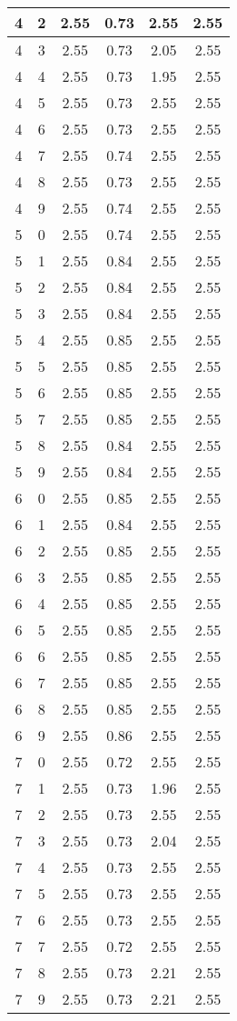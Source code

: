 \begin{longtable}{|c|c||c||c|c||c|}
	4 & 2 & 2.55 & 0.73 & 2.55 & 2.55 \\ \hline
	4 & 3 & 2.55 & 0.73 & 2.05 & 2.55 \\ \hline
	4 & 4 & 2.55 & 0.73 & 1.95 & 2.55 \\ \hline
	4 & 5 & 2.55 & 0.73 & 2.55 & 2.55 \\ \hline
	4 & 6 & 2.55 & 0.73 & 2.55 & 2.55 \\ \hline
	4 & 7 & 2.55 & 0.74 & 2.55 & 2.55 \\ \hline
	4 & 8 & 2.55 & 0.73 & 2.55 & 2.55 \\ \hline
	4 & 9 & 2.55 & 0.74 & 2.55 & 2.55 \\ \hline
	5 & 0 & 2.55 & 0.74 & 2.55 & 2.55 \\ \hline
	5 & 1 & 2.55 & 0.84 & 2.55 & 2.55 \\ \hline
	5 & 2 & 2.55 & 0.84 & 2.55 & 2.55 \\ \hline
	5 & 3 & 2.55 & 0.84 & 2.55 & 2.55 \\ \hline
	5 & 4 & 2.55 & 0.85 & 2.55 & 2.55 \\ \hline
	5 & 5 & 2.55 & 0.85 & 2.55 & 2.55 \\ \hline
	5 & 6 & 2.55 & 0.85 & 2.55 & 2.55 \\ \hline
	5 & 7 & 2.55 & 0.85 & 2.55 & 2.55 \\ \hline
	5 & 8 & 2.55 & 0.84 & 2.55 & 2.55 \\ \hline
	5 & 9 & 2.55 & 0.84 & 2.55 & 2.55 \\ \hline
	6 & 0 & 2.55 & 0.85 & 2.55 & 2.55 \\ \hline
	6 & 1 & 2.55 & 0.84 & 2.55 & 2.55 \\ \hline
	6 & 2 & 2.55 & 0.85 & 2.55 & 2.55 \\ \hline
	6 & 3 & 2.55 & 0.85 & 2.55 & 2.55 \\ \hline
	6 & 4 & 2.55 & 0.85 & 2.55 & 2.55 \\ \hline
	6 & 5 & 2.55 & 0.85 & 2.55 & 2.55 \\ \hline
	6 & 6 & 2.55 & 0.85 & 2.55 & 2.55 \\ \hline
	6 & 7 & 2.55 & 0.85 & 2.55 & 2.55 \\ \hline
	6 & 8 & 2.55 & 0.85 & 2.55 & 2.55 \\ \hline
	6 & 9 & 2.55 & 0.86 & 2.55 & 2.55 \\ \hline
	7 & 0 & 2.55 & 0.72 & 2.55 & 2.55 \\ \hline
	7 & 1 & 2.55 & 0.73 & 1.96 & 2.55 \\ \hline
	7 & 2 & 2.55 & 0.73 & 2.55 & 2.55 \\ \hline
	7 & 3 & 2.55 & 0.73 & 2.04 & 2.55 \\ \hline
	7 & 4 & 2.55 & 0.73 & 2.55 & 2.55 \\ \hline
	7 & 5 & 2.55 & 0.73 & 2.55 & 2.55 \\ \hline
	7 & 6 & 2.55 & 0.73 & 2.55 & 2.55 \\ \hline
	7 & 7 & 2.55 & 0.72 & 2.55 & 2.55 \\ \hline
	7 & 8 & 2.55 & 0.73 & 2.21 & 2.55 \\ \hline
	7 & 9 & 2.55 & 0.73 & 2.21 & 2.55 \\ \hline
\end{longtable}
